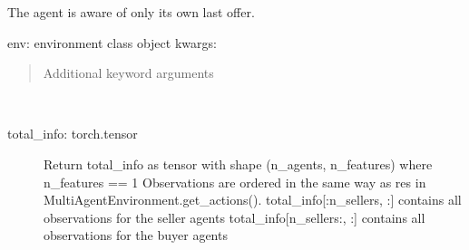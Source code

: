 \documentclass[letterpaper,10pt,english]{sphinxmanual}
\begin{document}
\begin{fulllineitems}
\label{\detokenize{MultiAgentMarketRL:info_setting.BlackBoxSetting}}
\sphinxAtStartPar
The agent is aware of only its own last offer.

\begin{fulllineitems}
\label{\detokenize{MultiAgentMarketRL:info_setting.BlackBoxSetting.__init__}}
\sphinxAtStartPar
env: environment class object
kwargs:
\begin{quote}

\sphinxAtStartPar
Additional keyword arguments
\end{quote}

\end{fulllineitems}


\begin{fulllineitems}
\label{\detokenize{MultiAgentMarketRL:info_setting.BlackBoxSetting.get_states}}~\begin{description}
\item[{total\_info: torch.tensor}] \leavevmode
\sphinxAtStartPar
Return total\_info as tensor with shape (n\_agents, n\_features) where n\_features == 1
Observations are ordered in the same way as res in MultiAgentEnvironment.get\_actions().
total\_info{[}:n\_sellers, :{]} contains all observations for the seller agents
total\_info{[}n\_sellers:, :{]} contains all observations for the buyer agents

\end{description}

\end{fulllineitems}


\end{fulllineitems}

\end{document}
